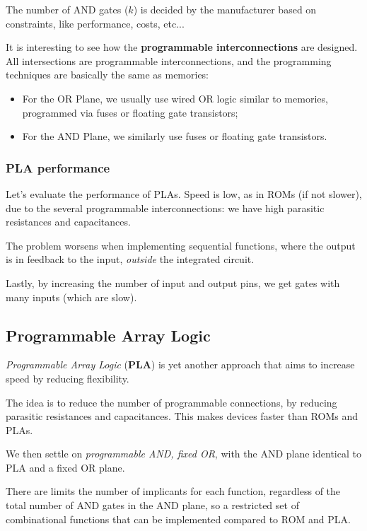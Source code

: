 \documentclass[a4paper,11pt]{article}
\begin{document}
The number of AND gates ($k$) is decided by the manufacturer based on constraints, like performance, costs, etc...

\par\smallskip

It is interesting to see how the \textbf{programmable interconnections} are designed.
All intersections are programmable interconnections, and the programming techniques are basically the same as memories:
\begin{itemize}
	\item For the OR Plane, we usually use wired OR logic similar to memories, programmed via fuses or floating gate transistors;
	\item For the AND Plane, we similarly use fuses or floating gate transistors.
\end{itemize}

\subsubsection{PLA performance}

Let's evaluate the performance of PLAs.
Speed is low, as in ROMs (if not slower), due to the several programmable interconnections: we have high parasitic resistances and capacitances.

The problem worsens when implementing sequential functions, where the output is in feedback to the input, \textit{outside} the integrated circuit.

Lastly, by increasing the number of input and output pins, we get gates with many inputs (which are slow).

\subsection{Programmable Array Logic}

\textit{Programmable Array Logic} (\textbf{PLA}) is yet another approach that aims to increase speed by reducing flexibility.

The idea is to reduce the number of programmable connections, by reducing parasitic resistances and capacitances.
This makes devices faster than ROMs and PLAs.

We then settle on \textit{programmable AND, fixed OR}, with the AND plane identical to PLA and a fixed OR plane.

There are limits the number of implicants for each function, regardless of the total number of AND gates in the AND plane, so a restricted set of combinational functions that can be implemented compared to ROM and PLA.
\end{document}
